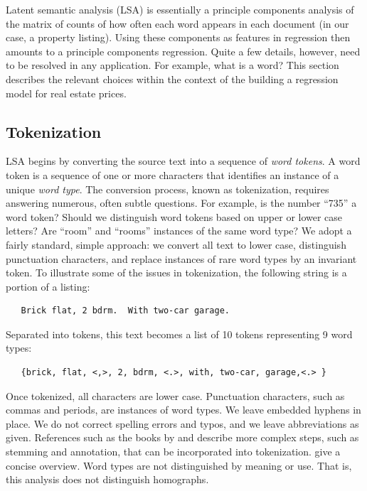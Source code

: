 \documentclass[10pt]{article}
\begin{document}
 Latent semantic analysis (LSA) is essentially a principle components analysis
 of the matrix of counts of how often each word appears in each document (in our
 case, a property listing).  Using these components as features in regression
 then amounts to a principle components regression.  Quite a few details,
 however, need to be resolved in any application. For example, what is a word?
 This section describes the relevant choices within the context of the building
 a regression model for real estate prices.
 
 \subsection{ Tokenization }  %

 LSA begins by converting the source text into a sequence of {\em word tokens}.
  A word token is a sequence of one or more characters that identifies an
 instance of a unique {\em word type}.  The conversion process, known as
 tokenization, requires answering numerous, often subtle questions.  For
 example, is the number ``735'' a word token?  Should we distinguish word tokens
 based on upper or lower case letters?  Are ``room'' and ``rooms'' instances of
 the same word type?  We adopt a fairly standard, simple approach: we convert
 all text to lower case, distinguish punctuation characters, and replace
 instances of rare word types by an invariant token.  To illustrate some of the
 issues in tokenization, the following string is a portion of a listing:
 \begin{verbatim}
   Brick flat, 2 bdrm.  With two-car garage. \end{verbatim} 
 \noindent
 Separated into tokens, this text becomes a list of 10 tokens representing 9
 word types:
 \begin{verbatim}
   {brick, flat, <,>, 2, bdrm, <.>, with, two-car, garage,<.> } \end{verbatim} 
 \noindent
 Once tokenized, all characters are lower case.  Punctuation characters, such as
 commas and periods, are instances of word types. We leave embedded hyphens in
 place.  We do not correct spelling errors and typos, and we leave abbreviations
 as given.  References such as the books by \citet{manning99} and
 \citet{jurafsky09} describe more complex steps, such as stemming and
 annotation, that can be incorporated into tokenization. \citet{turney10} give a
 concise overview.  Word types are not distinguished by meaning or use.  That
 is, this analysis does not distinguish homographs.
\end{document}

